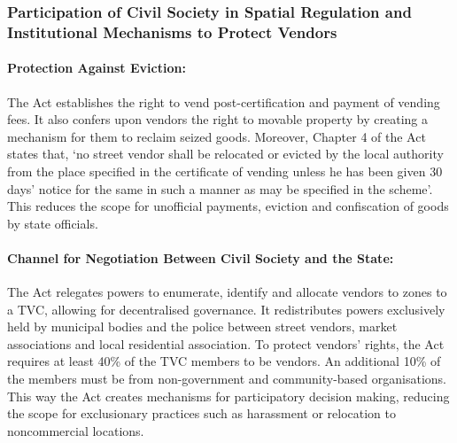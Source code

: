 \documentclass[a4paper, 12pt, twoside, table]{article}
\begin{document}
{\subsubsection*{Participation of Civil Society in Spatial Regulation and Institutional Mechanisms to Protect Vendors}

\paragraph*{Protection Against Eviction:} 

The Act establishes the right to vend post-certification and payment of vending fees. It also confers upon vendors the right to movable property by creating a mechanism for them to reclaim seized goods. Moreover, Chapter 4 of the Act states that, `no street vendor shall be relocated or evicted by the local authority from the place specified in the certificate of vending unless he has been given 30 days’ notice for the same in such a manner as may be specified in the scheme'. This reduces the scope for unofficial payments, eviction and confiscation of goods by state officials. 

\paragraph*{Channel for Negotiation Between Civil Society and the State:}

The Act relegates powers to enumerate, identify and allocate vendors to zones to a TVC, allowing for decentralised governance. It redistributes powers exclusively held by municipal bodies and the police between street vendors, market associations and local residential association. To protect vendors’ rights, the Act requires at least 40\% of the TVC members to be vendors. An additional 10\% of the members must be from non-government and community-based organisations. This way the Act creates mechanisms for participatory decision making, reducing the scope for exclusionary practices such as harassment or relocation to noncommercial locations.

}
\end{document}
